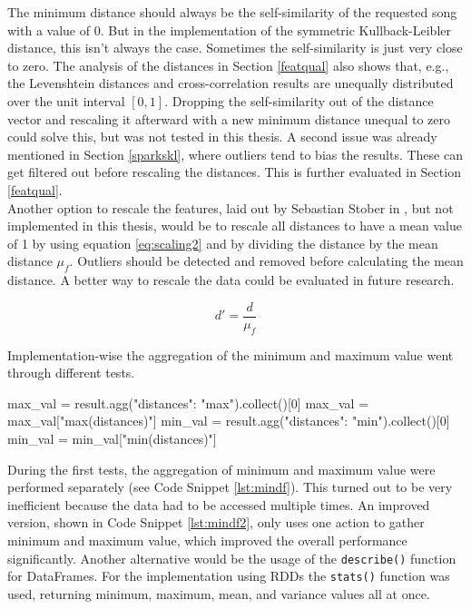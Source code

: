 \noindent The minimum distance should always be the self-similarity of the requested song with a value of 0. But in the implementation of the symmetric Kullback-Leibler distance, this isn't always the case. Sometimes the self-similarity is just very close to zero. The analysis of the distances in Section \ref{featqual} also shows that, e.g., the Levenshtein distances and cross-correlation results are unequally distributed over the unit interval $[0,1]$. Dropping the self-similarity out of the distance vector and rescaling it afterward with a new minimum distance unequal to zero could solve this, but was not tested in this thesis. A second issue was already mentioned in Section \ref{sparkskl}, where outliers tend to bias the results. These can get filtered out before rescaling the distances. This is further evaluated in Section \ref{featqual}.\\
Another option to rescale the features, laid out by Sebastian Stober in \cite[pp. 543ff]{musicdata}, but not implemented in this thesis, would be to rescale all distances to have a mean value of 1 by using equation \ref{eq:scaling2} and by dividing the distance by the mean distance $\mu_f$. Outliers should be detected and removed before calculating the mean distance. 
A better way to rescale the data could be evaluated in future research. 

\begin{equation} \label{eq:scaling2}
d' = \frac{d}{\mu_f}
\end{equation} 

\noindent Implementation-wise the aggregation of the minimum and maximum value went through different tests. 

\begin{pythonCode}[frame=single,label={lst:mindf},caption={Minimum and maximum aggregation separate},captionpos=b]
max_val = result.agg({"distances": "max"}).collect()[0]
max_val = max_val["max(distances)"]
min_val = result.agg({"distances": "min"}).collect()[0]
min_val = min_val["min(distances)"]
\end{pythonCode}

\noindent During the first tests, the aggregation of minimum and maximum value were performed separately (see Code Snippet \ref{lst:mindf}). This turned out to be very inefficient because the data had to be accessed multiple times. 
\noindent An improved version, shown in Code Snippet \ref{lst:mindf2}, only uses one action to gather minimum and maximum value, which improved the overall performance significantly. 
\noindent Another alternative would be the usage of the \lstinline{describe()} function for DataFrames. For the implementation using RDDs the \lstinline{stats()} function was used, returning minimum, maximum, mean, and variance values all at once. 

